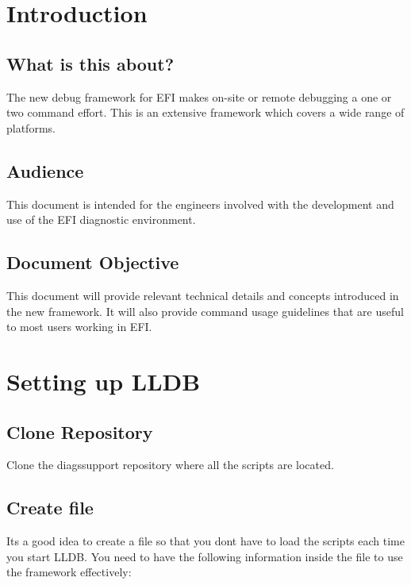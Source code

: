 
\section{Introduction}

\subsection{What is this about?}

The new debug framework for EFI makes on-site or remote debugging a one or two
command effort. This is an extensive framework which covers a wide range of
platforms.

\subsection{Audience}

This document is intended for the engineers involved with the development and 
use of the EFI diagnostic environment.

\subsection{Document Objective}

This document will provide relevant technical details and concepts introduced 
in the new framework. It will also provide command usage guidelines 
that are useful to most users working in EFI.

\section{Setting up LLDB}

\subsection{Clone Repository}

Clone the diagssupport repository where all the scripts are located. \\


\subsection{Create  file}

Its a good idea to create a  file so that you dont have to load the
scripts each time you start LLDB. You need to have the following information
inside the  file to use the framework effectively:

